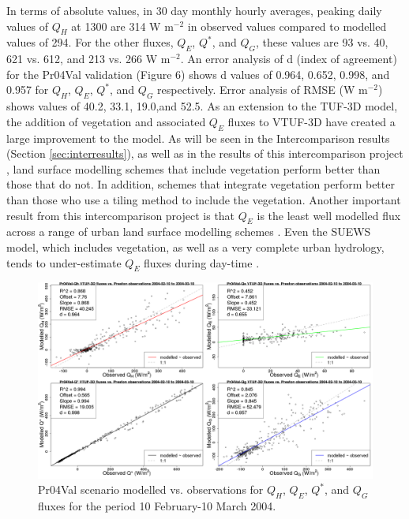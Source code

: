 \documentclass[final,3p,times,authoryear]{elsarticle}
\begin{document}
In terms of absolute values, in 30 day monthly hourly averages, peaking daily values of $Q_{H}$ at 1300 are 314 W m$^{-2}$ in observed values compared to modelled values of 294. For the other fluxes, $Q_{E}$, $Q^{*}$, and $Q_{G}$, these values are 93 vs. 40, 621 vs. 612, and 213 vs. 266 W m$^{-2}$. An error analysis of d (index of agreement) for the Pr04Val validation (Figure 6) shows d values of 0.964, 0.652, 0.998, and 0.957 for $Q_{H}$, $Q_{E}$, $Q^{*}$, and $Q_{G}$ respectively. Error analysis of RMSE (W m$^{-2}$) shows values of 40.2, 33.1, 19.0,and 52.5. As an extension to the TUF-3D model, the addition of vegetation and associated $Q_{E}$ fluxes to VTUF-3D have created a large improvement to the model. As will be seen in the Intercomparison results (Section \ref{sec:interresults}), as well as in the results of this intercomparison project \citep{Grimmond2011,Best2012}, land surface modelling schemes that include vegetation perform better than those that do not. In addition, schemes that integrate vegetation perform better than those who use a tiling method to include the vegetation. Another important result from this intercomparison project is that $Q_{E}$ is the least well modelled flux across a range of urban land surface modelling schemes \citep{Grimmond2010}. Even the SUEWS model, which includes vegetation, as well as a very complete urban hydrology, tends to under-estimate $Q_{E}$ fluxes during day-time \citep{Jarvi2011}.

\begin{figure}[!htbp]
\includegraphics[trim = 0mm 0mm 0mm 0mm, clip, scale=0.30]{images/Pr04Val-ErrorPlots.png}
\caption{Pr04Val scenario modelled vs. observations for $Q_{H}$, $Q_{E}$, $Q^{*}$, and $Q_{G}$ fluxes for the period 10 February-10 March 2004. \label{fig:Preston6error}}   
\end{figure}
\end{document}
